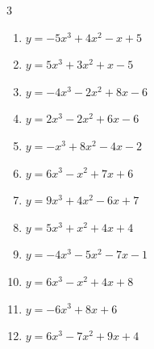 \begin{multicols}{3}
\begin{enumerate}

  \item $y=-5x^{3}+4x^{2}-x+5$


  \item $y=5x^{3}+3x^{2}+x-5$


  \item $y=-4x^{3}-2x^{2}+8x-6$


  \item $y=2x^{3}-2x^{2}+6x-6$


  \item $y=-x^{3}+8x^{2}-4x-2$


  \item $y=6x^{3}-x^{2}+7x+6$


  \item $y=9x^{3}+4x^{2}-6x+7$


  \item $y=5x^{3}+x^{2}+4x+4$


  \item $y=-4x^{3}-5x^{2}-7x-1$


  \item $y=6x^{3}-x^{2}+4x+8$


  \item $y=-6x^{3}+8x+6$


  \item $y=6x^{3}-7x^{2}+9x+4$



\end{enumerate}
\end{multicols}
